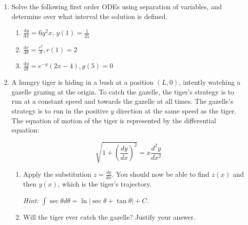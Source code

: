 \begin{enumerate}
\begin{minipage}[t]{6cm}
\end{minipage}
\item Solve the following first order ODEs using separation of variables, and determine over what interval the solution is defined.

\begin{enumerate}
    \item $\frac{\mathrm d y}{\mathrm d x} = 6y^2x$, $y(1) = \frac{1}{25}$

    \item $\frac{\mathrm d r}{\mathrm d \theta} = \frac{r^2}{\theta}, r(1) = 2 $  

    \item $\frac{\mathrm d y}{\mathrm d t} = e^{-y}(2x-4), y(5)=0$ 
\end{enumerate}

\item 
A hungry tiger is hiding in a bush at a position $(L, 0)$, intently watching a gazelle grazing at the origin. To catch the gazelle, the tiger's strategy is to run at a constant speed and towards the gazelle at all times. The gazelle's strategy is to run in the positive $y$ direction at the same speed as the tiger. The equation of motion of the tiger is represented by the differential equation:
	
	\[
	    \sqrt{1+\left(\frac{dy}{dx}\right)^2} = x\frac{d^2y}{dx^2}
	\]
\begin{enumerate}
	    \item Apply the substitution $z=\frac{dy}{dx}$. You should now be able to find $z(x)$ and then $y(x)$, which is the tiger's trajectory.
	    
	    \textit{Hint: $\int\sec{\theta}d\theta = \ln|\sec{\theta} + \tan{\theta}| + C$.}
    \item Will the tiger ever catch the gazelle? Justify your answer.

\end{enumerate}
\end{enumerate}